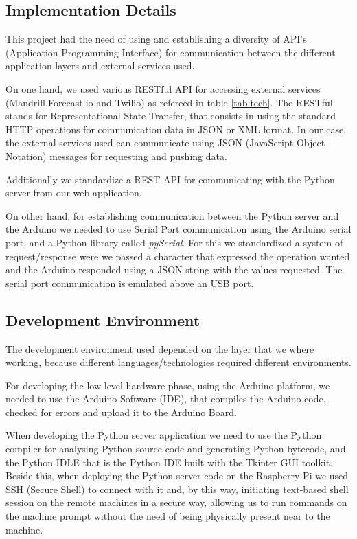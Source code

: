 \documentclass[12pt]{report}
\begin{document}
\subsection{Implementation Details}

This project had the need of using and establishing a diversity of API's (Application Programming Interface) for communication between the different application layers and external services used.

On one hand, we used various RESTful API for accessing external services (Mandrill\cite{mandrillapi},Forecast.io\cite{fcapi} and Twilio\cite{twilioapi}) as refereed in table \ref{tab:tech}. The RESTful stands for Representational State Transfer, that consists in using the standard HTTP operations for communication data in JSON or XML format. In our case, the external services used can communicate using JSON (JavaScript Object Notation) messages for requesting and pushing data.

Additionally we standardize a REST API for communicating with the Python server from our web application.

On other hand, for establishing communication between the Python server and the Arduino we needed to use Serial Port communication using the Arduino serial port\cite{serial}, and a Python library called \textit{pySerial}\cite{pyserial}. For this we standardized a system of request/response were we passed a character that expressed the operation wanted and the Arduino responded using a JSON string with the values requested. The serial port communication is emulated above an USB port.



\subsection{Development Environment}

The development environment used depended on the layer that we where working, because different languages/technologies required different environments.

For developing the low level hardware phase, using the Arduino platform, we needed to use the Arduino Software (IDE)\cite{arduinoide}, that compiles the Arduino code, checked for errors and upload it to the Arduino Board.

When developing the Python server application we need to use the Python compiler for analysing Python source code and generating Python bytecode, and the Python IDLE that is the Python IDE built with the Tkinter GUI toolkit. Beside this, when deploying the Python server code on the Raspberry Pi we used  SSH (Secure Shell) to connect with it and, by this way, initiating text-based shell session on the remote machines in a secure way, allowing us to run commands on the machine prompt without the need of being physically present near to the machine.
\end{document}
